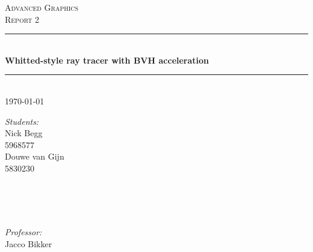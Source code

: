 \documentclass[a4paper,12pt]{article}
\newcommand{\vak}{Advanced Graphics}
\newcommand{\type}{Report 2}
\newcommand{\titel}{Whitted-style ray tracer with BVH acceleration}
\newcommand{\studentA}{Nick Begg}
\newcommand{\uvanetidA}{5968577}
\newcommand{\studentB}{Douwe van Gijn}
\newcommand{\uvanetidB}{5830230}
\newcommand{\docent}{Jacco Bikker}
\newcommand{\datum}{\today}
\begin{document}
\thispagestyle{firststyle}
\begin{center}
	\textsc{\LARGE \vak}\\[1cm]
	\textsc{\huge \type}\\[0.5cm]
		\rule{\linewidth}{0.5pt} \\[0.5cm]
			{\huge \bfseries \titel}
		\rule{\linewidth}{0.5pt} \\[0.5cm]
	{\large \datum\\[1.5cm]}
	
	\begin{minipage}{0.4\textwidth}
		\begin{flushleft} 
			\emph{Students:}\\[0.1cm]
			{\studentA\\ {\uvanetidA\\[0.2cm]}}
			{\studentB\\ {\uvanetidB\\[0.2cm]}}
			{\studentC\\ {\uvanetidC\\[0.2cm]}}
		\end{flushleft}
	\end{minipage}~%
	\begin{minipage}{0.4\textwidth}
		\begin{flushright} 
			\emph{Professor:} \\[0.1cm]
			\docent\\[0.2cm]
		\end{flushright}
	\end{minipage}\\[1.5 cm]
\end{center}

\newpage


\end{document}
